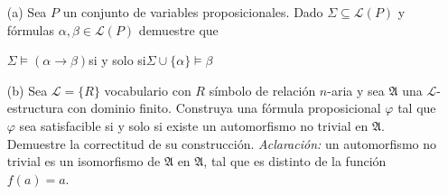 \begin{enumerate}
	\item[(a)] Sea $P$ un conjunto de variables proposicionales. Dado $\Sigma\subseteq\mathcal{L}(P)$ y fórmulas $\alpha,\beta\in\mathcal{L}(P)$ demuestre que \vspace{-3ex}
	\begin{center}
		$\Sigma\models(\alpha\rightarrow\beta)$\quad si y solo si\quad $\Sigma\cup\{\alpha\}\models\beta$
	\end{center}
	\item[(b)] Sea $\mathcal{L}=\{R\}$ vocabulario con $R$ símbolo de relación $n$-aria y sea $\mathfrak{A}$ una $\mathcal{L}$-estructura con dominio finito. Construya una fórmula proposicional $\varphi$ tal que $\varphi$ sea satisfacible si y solo si existe un automorfismo no trivial en $\mathfrak{A}$. Demuestre la correctitud de su construcción.
	\textit{Aclaración:} un automorfismo no trivial es un isomorfismo de $\mathfrak{A}$ en $\mathfrak{A}$, tal que es distinto de la función $f(a)=a$.

\end{enumerate}
